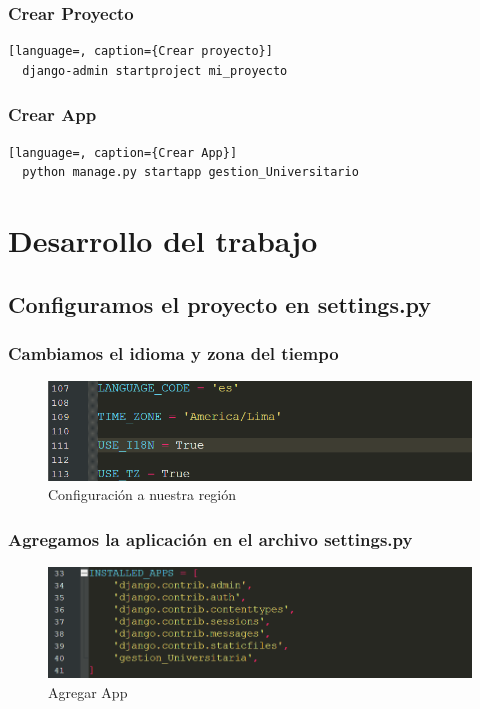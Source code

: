 \documentclass{article}
\begin{document}
  \subsubsection{Crear Proyecto}
  \begin{lstlisting}[language=, caption={Crear proyecto}]
  django-admin startproject mi_proyecto
  \end{lstlisting}
  

  \subsubsection{Crear App}
  \begin{lstlisting}[language=, caption={Crear App}]
  python manage.py startapp gestion_Universitario
  \end{lstlisting}
  \newpage
  

  \section{Desarrollo del trabajo}
  

  \subsection{Configuramos el proyecto en settings.py}
  

  \subsubsection{Cambiamos el idioma y zona del tiempo}
  \begin{figure}[H]
    \centering
    \includegraphics[width=1\textwidth, keepaspectratio]{img/lenguaje.png}
    \caption{Configuración a nuestra región}
  \end{figure}


  \subsubsection{Agregamos la aplicación en el archivo settings.py}
  \begin{figure}[H]
    \centering
    \includegraphics[width=1\textwidth, keepaspectratio]{img/app.png}
    \caption{Agregar App}
  \end{figure}
  
\end{document}
